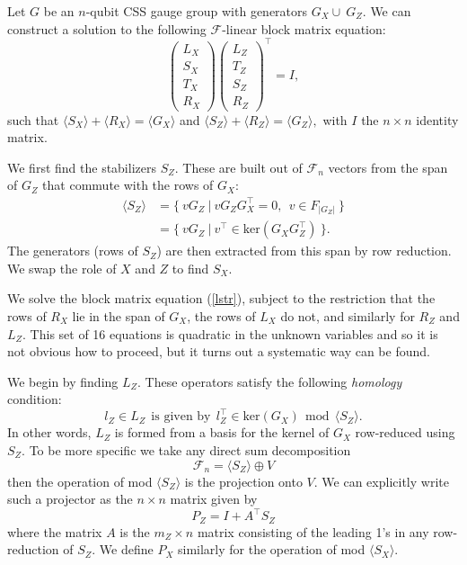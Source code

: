 \documentclass[11pt,oneside]{article}
\newcommand{\Eref}[1]{(\ref{#1})}
\def\Span#1{\langle #1 \rangle}
\def\smbox#1{\ \ \mbox{#1}\ \ }
\newcommand{\Field}{\mathcal{F}}
\def\Ker{\mathrm{ker}}
\def\Fnd{\Field_{n}}
\newcommand\dotheorem[1]{\vskip 5pt \noindent {\bf \underline{Theorem #1.}\ }}
\newcommand\doproof{\vskip 5pt \noindent{\bf \underline{Proof:}\ }}
\begin{document}
\dotheorem{(Decomposition)}
Let $G$ be an $n$-qubit 
CSS gauge group with generators $G_X\cup~G_Z.$
We can construct a solution to the following $\Field$-linear
block matrix equation:
\begin{equation}\label{lstr}
\left( \begin{array}{l}
L_X\\
S_X\\
T_X\\
R_X
\end{array} \right)
\left( \begin{array}{l}
L_Z\\
T_Z\\
S_Z\\
R_Z
\end{array} \right)^\top =
I,
\end{equation}
such that 
$\Span{S_X}+\Span{R_X} = \Span{G_X}$
and 
$\Span{S_Z}+\Span{R_Z} = \Span{G_Z},$
with $I$ the $n\times n$ identity matrix.

\doproof
We first find the stabilizers $S_Z$.
These are built out of $\Fnd$ vectors from the span of $G_Z$
that commute with the rows of $G_X:$
\begin{align*}
    \Span{S_Z} &= \{\  vG_Z \ |\  v G_Z G_X^\top = 0, \ \ v \in F_{|G_Z|}\ \} \\
               &= \{\  vG_Z \ |\  v^\top \in \Ker(G_X G_Z^\top)  \ \}.
\end{align*}
The generators (rows of $S_Z$) are then extracted
from this span by row reduction.
We swap the role of $X$ and $Z$ to find $S_X.$


We solve the block matrix equation \Eref{lstr},
subject to the restriction that the rows of
$R_X$ lie in the span of $G_X$,
the rows of $L_X$ do not,
and similarly for $R_Z$ and $L_Z.$
This set of 16 equations is quadratic in the unknown variables
and so it is not obvious how to proceed, but it turns out a
systematic way can be found.

We begin by finding $L_Z.$
These operators satisfy the following \emph{homology} condition:
$$
    l_Z \in L_Z \smbox{is given by} l_Z^\top \in \Ker(G_X) \smbox{mod} \Span{S_Z}.
$$
In other words, $L_Z$ is formed from a basis for the kernel of $G_X$ 
row-reduced using $S_Z.$
To be more specific %
we take any direct sum decomposition
$$\Fnd = \Span{S_Z} \oplus V$$
then the operation of mod $\Span{S_Z}$ is the
projection onto $V.$
We can explicitly write such a 
projector as the $n\times n$
matrix given by
$$
    P_Z = I + A^\top S_Z
$$
where the matrix $A$ is the $m_Z\times n$ matrix consisting of
the leading 1's in any row-reduction of $S_Z.$
We define $P_X$ similarly for the operation of mod $\Span{S_X}.$
\end{document}
